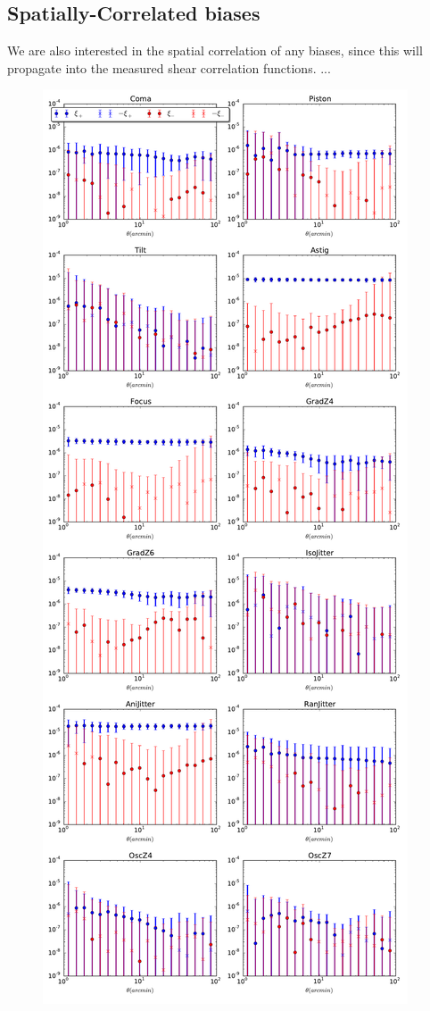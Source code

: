 \documentclass[aps,prd, amsmath,amssymb,superscriptaddress,showkeys,nofootinbib,reprint,preprintnumbers]{revtex4-1}
\begin{document}
\subsection{Spatially-Correlated biases}

We are also interested in the spatial correlation of any biases, since this will propagate into the measured shear correlation functions. ...

\begin{figure}
\begin{center}
\includegraphics[width=\columnwidth]{figures/2pt_corrs.pdf}

\end{center}
\end{figure}
\end{document}
